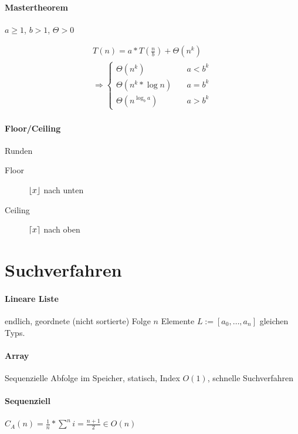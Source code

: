 \paragraph{Mastertheorem} $a \geq 1$, $b > 1$, $\Theta > 0$


\begin{gather*}
  T(n) = a * T( \frac{n}{b} ) + \Theta (n^k) \\
  \Rightarrow \begin{cases}
    \Theta ( n^k ) \quad          & a < b^k \\
    \Theta ( n^k * \log n ) \quad & a = b^k \\
    \Theta ( n^{\log_b a} ) \quad & a > b^k
  \end{cases}
\end{gather*}

\paragraph{Floor/Ceiling} Runden

\begin{description}
  \item [Floor] $\lfloor x\rfloor$ nach unten

  \item [Ceiling] $\lceil x\rceil$ nach oben
\end{description}

\section{Suchverfahren}

\paragraph{Lineare Liste}
endlich, geordnete (nicht sortierte) Folge $n$ Elemente $L := [a_0, \dots, a_n]$ gleichen Typs.

\paragraph{Array}
Sequenzielle Abfolge im Speicher, statisch, Index $O(1)$, schnelle Suchverfahren

\paragraph{Sequenziell}
$C_A(n) = \frac{1}{n} * \sum^n i = \frac{n + 1}{2} \in O(n)$\

